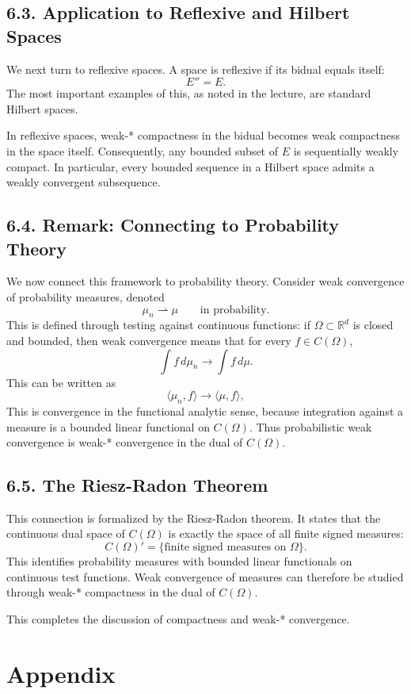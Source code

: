 \documentclass[11pt]{article}
\theoremstyle{definition}
\theoremstyle{remark}
\begin{document}
\subsection*{6.3. Application to Reflexive and Hilbert Spaces}
We next turn to reflexive spaces. A space is reflexive if its bidual equals itself:
\[
E''=E.
\]
The most important examples of this, as noted in the lecture, are standard Hilbert spaces.

In reflexive spaces, weak-* compactness in the bidual becomes weak compactness in the space itself. Consequently, any bounded subset of \(E\) is sequentially weakly compact. In particular, every bounded sequence in a Hilbert space admits a weakly convergent subsequence.

\subsection*{6.4. Remark: Connecting to Probability Theory}
We now connect this framework to probability theory. Consider weak convergence of probability measures, denoted
\[
\mu_n \rightharpoonup \mu
\qquad \text{in probability}.
\]
This is defined through testing against continuous functions: if \(\Omega\subset \mathbb R^d\) is closed and bounded, then weak convergence means that for every \(f\in C(\Omega)\),
\[
\int f\,d\mu_n \to \int f\,d\mu.
\]
This can be written as
\[
\langle \mu_n,f\rangle \to \langle \mu,f\rangle,
\]
This is convergence in the functional analytic sense, because integration against a measure is a bounded linear functional on \(C(\Omega)\). Thus probabilistic weak convergence is weak-* convergence in the dual of \(C(\Omega)\).

\subsection*{6.5. The Riesz-Radon Theorem}
This connection is formalized by the Riesz-Radon theorem. It states that the continuous dual space of \(C(\Omega)\) is exactly the space of all finite signed measures:
\[
C(\Omega)'=\{\text{finite signed measures on }\Omega\}.
\]
This identifies probability measures with bounded linear functionals on continuous test functions. Weak convergence of measures can therefore be studied through weak-* compactness in the dual of \(C(\Omega)\).

This completes the discussion of compactness and weak-* convergence.

\section*{Appendix}
\end{document}
